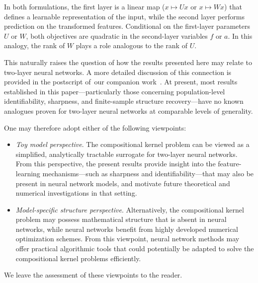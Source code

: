 \documentclass[sn-mathphys-num]{sn-jnl}%
\numberwithin{equation}{section}
\theoremstyle{thmstyleone}%
\theoremstyle{thmstyletwo}%
\theoremstyle{thmstylethree}%
\begin{document}
In both formulations, the first layer is a linear map ($x \mapsto Ux$ or $x \mapsto Wx$) that defines a learnable representation of the input, while the second layer performs prediction on the transformed features. Conditional on the first-layer parameters $U$ or $W$, both objectives are quadratic in the second-layer variables $f$ or $a$. In this analogy, the rank of $W$ plays a role analogous to the rank of $U$.


This naturally raises the question of how the results presented here may relate to two-layer neural networks. A more detailed discussion of this connection is provided in the postscript of~our companion work~\cite{LiRub25}.  At present, most  results established in this paper—particularly those concerning population-level identifiability, sharpness, and finite-sample structure recovery—have no known analogues proven for two-layer neural networks at comparable levels of generality. 

One may therefore adopt either of the following viewpoints: \vspace{.5em}
\begin{itemize}
\item 
\emph{Toy model perspective}. The compositional kernel problem can be viewed as a simplified, analytically tractable surrogate for two-layer neural networks. From this perspective, the present results provide insight into the feature-learning mechanisms—such as sharpness and identifiability—that may also be present in neural network models, and motivate future theoretical and numerical investigations in that setting. 
\vspace{.5em} 
\item 
\emph{Model-specific structure perspective}. Alternatively, the compositional kernel problem may possess mathematical structure that is absent in neural networks, while neural networks benefit from highly developed numerical optimization schemes. From this viewpoint, neural network methods may offer practical algorithmic tools that could potentially be adapted to solve the compositional kernel problems efficiently.
\end{itemize}  \vspace{.5em}
We leave the assessment of these viewpoints to the reader.
\end{document}
